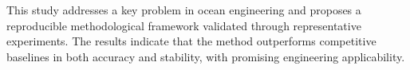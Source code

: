 This study addresses a key problem in ocean engineering and proposes a reproducible methodological framework validated through representative experiments. The results indicate that the method outperforms competitive baselines in both accuracy and stability, with promising engineering applicability.
